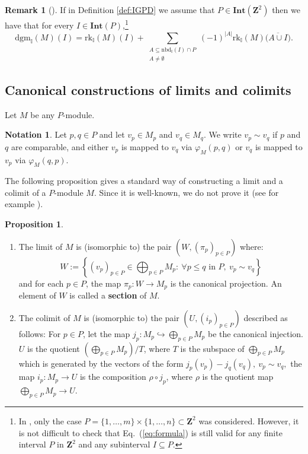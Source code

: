 \documentclass[11pt]{article}
\theoremstyle{definition}
\newtheorem{proposition}[theorem]{Proposition}
\newtheorem{remark}[theorem]{Remark}
\newtheorem{notation}[theorem]{Notation}
\newcommand{\intnbd}{\mathrm{nbd}_{\mathbb{I}}}
\newcommand{\intrk}{\mathrm{rk}_{\mathbb{I}}}
\newcommand{\intdgm}{\mathrm{dgm}_{\mathbb{I}}}
\newcommand{\Int}{\mathbf{Int}}
\newcommand{\Pb}{P}
\newcommand{\Z}{\mathbf{Z}}
\newcommand{\abs}[1]{\left\lvert{#1}\right\rvert}
\begin{document}
\begin{remark}[{\cite[Theorem 5.3]{asashiba2019approximation}}] If in Definition \ref{def:IGPD} we assume that $\Pb\in \Int(\Z^2)$ 
then we have that for every $I\in\Int(\Pb)$,\footnote{In \cite{asashiba2019approximation}, only the case  $\Pb=\{1,\ldots,m\}\times \{1,\ldots,n\}\subset \Z^2$ was considered. However, it is not difficult to check that Eq.~(\ref{eq:formula}) is still valid for any finite interval $P$ in $\Z^2$ and any subinterval $I\subseteq P$.} 
\begin{equation}\label{eq:formula}
 \intdgm(M)(I)=\intrk(M)(I)+\sum_{\substack{A\subseteq \intnbd(I)\cap P\\ A\neq \emptyset }}(-1)^{\abs{A}}\intrk(M)\bigg(\overline{A\cup I}\bigg).
\end{equation}
\end{remark}

\subsection{Canonical constructions of limits and colimits}\label{sec:canonical limits and colimits}

Let $M$ be any $P$-module.
\begin{notation}\label{not:sim}
Let $p,q\in \Pb$ and let $v_{p}\in M_p$ and $v_{q}\in M_q$. We write $v_p\sim v_q$ if $p$ and $q$ are comparable, and either $v_p$ is mapped to $v_q$ via $\varphi_M(p,q)$ or $v_q$ is mapped to $v_p$ via $\varphi_M(q,p)$.
\end{notation}

The following proposition gives a standard way of constructing a limit and a colimit of a $P$-module $M$. Since it is well-known, we do not prove it (see for example \cite[Section E]{kim2018generalized}).

\begin{proposition}\label{prop:computation} 
	\begin{enumerate}[label=(\roman*)]
		\item \label{item:limit}The limit of $M$ is (isomorphic to) the pair $\left(W,(\pi_p)_{p\in \Pb}\right)$ where: 	\begin{equation}\label{eq:limit}
		    W:=\left\{(v_p)_{p\in \Pb}\in \bigoplus_{p\in \Pb} M_p:\ \forall p\leq q \mbox{ in } \Pb,\ v_{p}\sim v_{q} \right\}
		\end{equation}
		and for each $p\in \Pb$, the map $\pi_p:W\rightarrow M_p$ is the canonical projection. An element of $W$ is called a \textbf{section} of $M$.
		\item The colimit of $M$ is (isomorphic to) the pair $\left(U, (i_p)_{p\in \Pb}\right)$ described as follows: For $p\in \Pb$, let the map $j_p:M_p\hookrightarrow \bigoplus_{p\in \Pb}M_p$ be the canonical injection. $U$ is the quotient  $\left(\bigoplus_{p\in \Pb}M_p\right)/T$, where $T$ is the subspace of $\bigoplus_{p\in \Pb} M_p$ which is generated by the vectors of the form  $j_p(v_p)-j_q(v_q), \ v_p\sim v_{q},$ the map $i_p:M_p\rightarrow U$ is the composition $\rho\circ j_p$, where $\rho$ is the quotient map   $\bigoplus_{p\in \Pb} M_p\rightarrow U$.
		\label{item:colim}
	\end{enumerate}
\end{proposition} 
\end{document}
